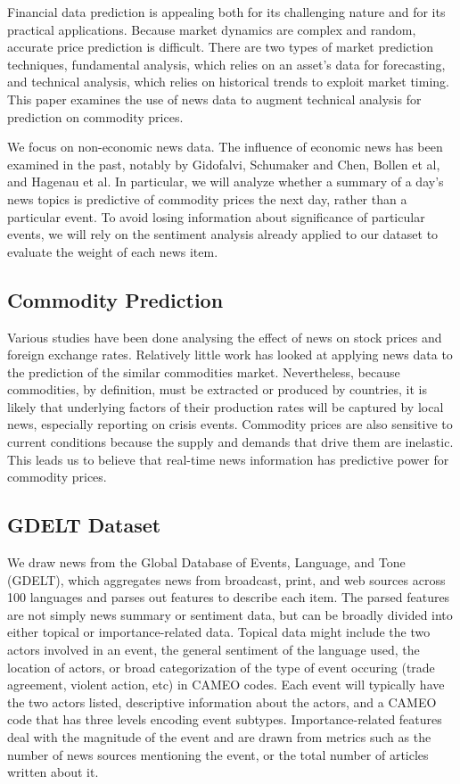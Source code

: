 Financial data prediction is appealing both for its challenging nature and for its practical applications. Because market dynamics are complex and random, accurate price prediction is difficult. There are two types of market prediction techniques, fundamental analysis, which relies on an asset's data for forecasting, and technical analysis, which relies on historical trends to exploit market timing.\cite{schumaker2009textual} This paper examines the use of news data to augment technical analysis for prediction on commodity prices.

We focus on non-economic news data. The influence of economic news has been examined in the past, notably by Gidofalvi, Schumaker and Chen, Bollen et al, and Hagenau et al.\cite{gidofalvi2001using}\cite{schumaker2009textual}\cite{bollen2011twitter}\cite{hagenau2012automated} In particular, we will analyze whether a summary of a day's news topics is predictive of commodity prices the next day, rather than a particular event. To avoid losing information about significance of particular events, we will rely on the sentiment analysis already applied to our dataset to evaluate the weight of each news item.

\subsection{Commodity Prediction}
Various studies have been done analysing the effect of news on stock prices\cite{mcqueen1993stock} and foreign exchange rates\cite{kamruzzaman2003svm}. Relatively little work has looked at applying news data to the prediction of the similar commodities market. Nevertheless, because commodities, by definition, must be extracted or produced by countries, it is likely that underlying factors of their production rates will be captured by local news, especially reporting on crisis events. Commodity prices are also sensitive to current conditions because the supply and demands that drive them are inelastic.\cite{chen2008can} This leads us to believe that real-time news information has predictive power for commodity prices. 

\subsection{GDELT Dataset}
We draw news from the Global Database of Events, Language, and Tone (GDELT), which aggregates news from broadcast, print, and web sources across 100 languages and parses out features to describe each item. The parsed features are not simply news summary or sentiment data, but can be broadly divided into either topical or importance-related data. Topical data might include the two actors involved in an event, the general sentiment of the language used, the location of actors, or broad categorization of the type of event occuring (trade agreement, violent action, etc) in CAMEO codes. Each event will typically have the two actors listed, descriptive information about the actors, and a CAMEO code that has three levels encoding event subtypes. Importance-related features deal with the magnitude of the event and are drawn from metrics such as the number of news sources mentioning the event, or the total number of articles written about it. 

